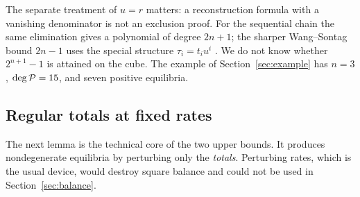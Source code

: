 \begin{remark}
The separate treatment of \(u=r\) matters: a reconstruction formula with a vanishing
denominator is not an exclusion proof. For the sequential chain the same elimination gives a
polynomial of degree \(2n+1\); the sharper Wang--Sontag bound \(2n-1\) uses the special
structure \(\tau_i=t_iu^i\) \cite{WangSontag2008}. We do not know whether \(2^{n+1}-1\) is
attained on the cube. The example of Section~\ref{sec:example} has \(n=3\), \(\deg\mathcal P=15\), and
seven positive equilibria.
\end{remark}

\subsection{Regular totals at fixed rates}
The next lemma is the technical core of the two upper bounds. It produces nondegenerate
equilibria by perturbing only the \emph{totals}. Perturbing rates, which is the usual device,
would destroy square balance and could not be used in Section~\ref{sec:balance}.


